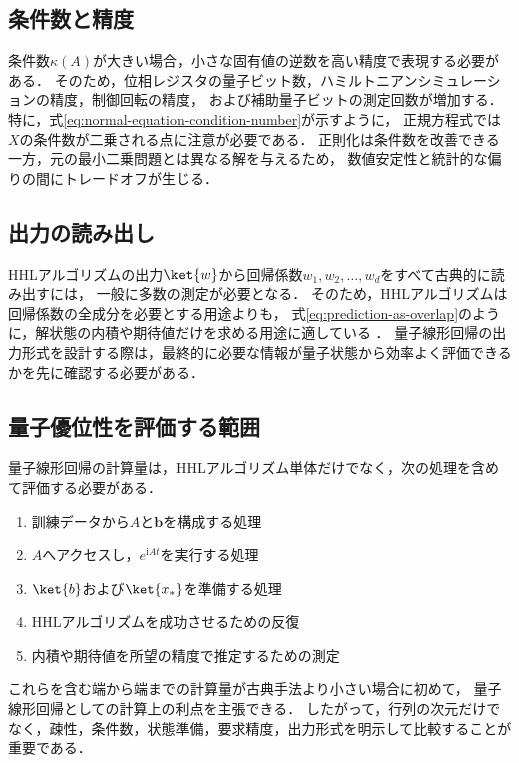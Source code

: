 \subsection{条件数と精度}
\label{subsec:condition-number-and-precision}

条件数$\kappa(A)$が大きい場合，小さな固有値の逆数を高い精度で表現する必要がある．
そのため，位相レジスタの量子ビット数，ハミルトニアンシミュレーションの精度，制御回転の精度，
および補助量子ビットの測定回数が増加する．
特に，式\eqref{eq:normal-equation-condition-number}が示すように，
正規方程式では$X$の条件数が二乗される点に注意が必要である．
正則化は条件数を改善できる一方，元の最小二乗問題とは異なる解を与えるため，
数値安定性と統計的な偏りの間にトレードオフが生じる．

\subsection{出力の読み出し}
\label{subsec:solution-readout}

HHLアルゴリズムの出力$\ket{w}$から回帰係数$w_1,w_2,\ldots,w_d$をすべて古典的に読み出すには，
一般に多数の測定が必要となる．
そのため，HHLアルゴリズムは回帰係数の全成分を必要とする用途よりも，
式\eqref{eq:prediction-as-overlap}のように，解状態の内積や期待値だけを求める用途に適している
\cite{shimada2020}．
量子線形回帰の出力形式を設計する際は，最終的に必要な情報が量子状態から効率よく評価できるかを先に確認する必要がある．

\subsection{量子優位性を評価する範囲}
\label{subsec:end-to-end-evaluation}

量子線形回帰の計算量は，HHLアルゴリズム単体だけでなく，次の処理を含めて評価する必要がある．

\begin{enumerate}[(1)]
  \item 訓練データから$A$と$\bm{b}$を構成する処理
  \item $A$へアクセスし，$e^{\mathrm{i}At}$を実行する処理
  \item $\ket{b}$および$\ket{x_{*}}$を準備する処理
  \item HHLアルゴリズムを成功させるための反復
  \item 内積や期待値を所望の精度で推定するための測定
\end{enumerate}

これらを含む端から端までの計算量が古典手法より小さい場合に初めて，
量子線形回帰としての計算上の利点を主張できる．
したがって，行列の次元だけでなく，疎性，条件数，状態準備，要求精度，出力形式を明示して比較することが重要である．
